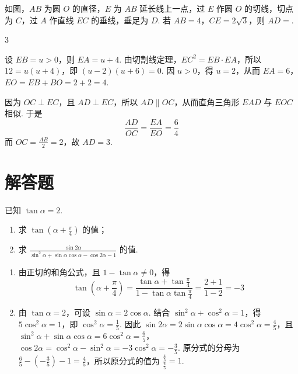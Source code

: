 \begin{problem}
如图，\(AB\) 为圆 \(O\) 的直径，\(E\) 为 \(AB\) 延长线上一点，过 \(E\) 作圆 \(O\) 的切线，切点为 \(C\)，过 \(A\) 作直线 \(EC\) 的垂线，垂足为 \(D\). 若 \(AB = 4\)，\(CE = 2\sqrt{3}\)，则 \(AD =\)\fillinblank{}.
\end{problem}

\begin{answer}
3
\end{answer}

\begin{solution}
设 \(EB=u>0\)，则 \(EA=u+4\). 由切割线定理，\(EC^2=EB\cdot EA\)，所以 \(12=u(u+4)\)，即 \((u-2)(u+6)=0\). 因 \(u>0\)，得 \(u=2\)，从而 \(EA=6\)，\(EO=EB+BO=2+2=4\).

因为 \(OC\perp EC\)，且 \(AD\perp EC\)，所以 \(AD\parallel OC\)，从而直角三角形 \(EAD\) 与 \(EOC\) 相似. 于是
\[
\frac{AD}{OC}=\frac{EA}{EO}=\frac{6}{4}
\]
而 \(OC=\frac{AB}{2}=2\)，故 \(AD=3\).
\end{solution}

\section{解答题}

\begin{problem}
已知 \(\tan \alpha = 2\).
\begin{enumerate}
\item 求 \( \tan\left(\alpha+\frac{\pi}{4}\right) \) 的值；
\item 求 \( \frac{\sin 2\alpha}{\sin^{2}\alpha + \sin \alpha \cos \alpha - \cos 2\alpha - 1} \) 的值.
\end{enumerate}
\end{problem}

\begin{solution}
\begin{enumerate}
\item 由正切的和角公式，且 \(1-\tan\alpha\neq0\)，得
\[
\tan\left(\alpha+\frac{\pi}{4}\right)=\frac{\tan\alpha+\tan\frac{\pi}{4}}{1-\tan\alpha\tan\frac{\pi}{4}}=\frac{2+1}{1-2}=-3
\]

\item 由 \(\tan\alpha=2\)，可设 \(\sin\alpha=2\cos\alpha\). 结合 \(\sin^2\alpha+\cos^2\alpha=1\)，得 \(5\cos^2\alpha=1\)，即 \(\cos^2\alpha=\frac15\). 因此 \(\sin2\alpha=2\sin\alpha\cos\alpha=4\cos^2\alpha=\frac45\)，且 \(\sin^2\alpha+\sin\alpha\cos\alpha=6\cos^2\alpha=\frac65\)，\(\cos2\alpha=\cos^2\alpha-\sin^2\alpha=-3\cos^2\alpha=-\frac35\). 原分式的分母为 \(\frac65-\left(-\frac35\right)-1=\frac45\)，所以原分式的值为 \(\frac{\frac{4}{5}}{\frac{4}{5}}=1\).
\end{enumerate}
\end{solution}

